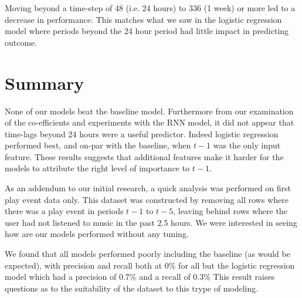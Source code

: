 Moving beyond a time-step of 48 (i.e. 24 hours) to 336 (1 week) or more led to a decrease in performance. This matches what we saw in the logistic regression model where periods beyond the 24 hour period had little impact in predicting outcome.

\section{Summary}

None of our models beat the baseline model. Furthermore from our examination of the co-efficients and experiments with the RNN model, it did not appear that time-lags beyond 24 hours were a useful predictor. Indeed logistic regression performed best, and on-par with the baseline, when $t-1$ was the only input feature. These results suggests that additional features make it harder for the models to attribute the right level of importance to $t-1$. 

As an addendum to our initial research, a quick analysis was performed on first play event data only. This dataset was constructed by removing all rows where there was a play event in periods $t-1$ to $t-5$, leaving behind rows where the user had not listened to music in the past 2.5 hours. We were interested in seeing how are our models performed without any tuning.

We found that all models performed poorly including the baseline (as would be expected), with precision and recall both at 0\% for all but the logistic regression model which had a precision of 0.7\% and a recall of 0.3\% This result raises questions as to the suitability of the dataset to this trype of modeling.